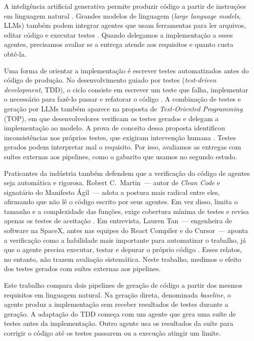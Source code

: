 \documentclass[a4paper,12pt,twoside,english,brazilian]{book}
\begin{document}
A inteligência artificial generativa permite produzir código a partir de
instruções em linguagem natural \citep{ibmGenerativeAI}. Grandes modelos de
linguagem (\emph{large language models}, LLMs) também podem integrar agentes que
usam ferramentas para ler arquivos, editar código e executar testes
\citep{trivedy2026harness}. Quando delegamos a implementação a esses agentes,
precisamos avaliar se a entrega atende aos requisitos e quanto custa obtê-la.

Uma forma de orientar a implementação é escrever testes automatizados antes do
código de produção. No desenvolvimento guiado por testes (\emph{test-driven
development}, TDD), o ciclo consiste em escrever um teste que falha, implementar
o necessário para fazê-lo passar e refatorar o código \citep{beck2003tdd}.
A combinação de testes e geração por LLMs também aparece na proposta de
\emph{Test-Oriented Programming} (TOP), em que desenvolvedores verificam os
testes gerados e delegam a implementação ao modelo. A prova de conceito dessa
proposta identificou inconsistências nos próprios testes, que exigiram
intervenção humana \citep{melegati2026top}. Testes gerados podem interpretar mal
o requisito. Por isso, avaliamos as entregas com suítes externas aos pipelines,
como o gabarito que usamos no segundo estudo.

Praticantes da indústria também defendem que a verificação do código de
agentes seja automática e rigorosa. Robert C.~Martin~--- autor de
\textit{Clean Code} e signatário do Manifesto Ágil~--- adota a postura mais
radical entre eles, afirmando que não lê o código escrito por seus agentes. Em
vez disso, limita o tamanho e a complexidade das
funções, exige cobertura mínima de testes e revisa apenas os testes de
aceitação \citep{thakker2026unclebob}. Em entrevista, Lauren Tan~--- engenheira
de software na SpaceX, antes nas equipes do React Compiler e do Cursor~---
aponta a
verificação como a habilidade mais importante para automatizar o trabalho, já que
o agente precisa executar, testar e depurar o próprio código
\citep{pocock2026poteto}. Esses relatos, no entanto, não trazem avaliação sistemática.
Neste trabalho, medimos o efeito dos testes gerados com suítes externas aos
pipelines.

Este trabalho compara dois pipelines de geração de código a partir dos mesmos
requisitos em linguagem natural. Na geração direta, denominada \emph{baseline}, o
agente produz a implementação sem receber resultados de testes durante a
geração. A adaptação do TDD começa com um agente que gera uma suíte de
testes antes da implementação. Outro agente usa os resultados da suíte para
corrigir o código até os testes passarem ou a execução atingir um limite.
\end{document}
